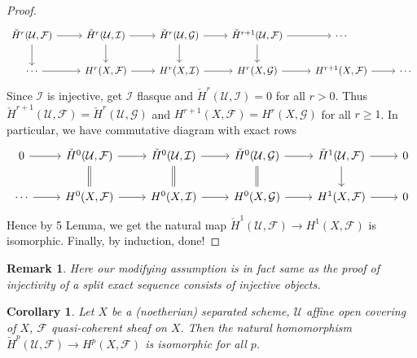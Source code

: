 \documentclass{ctexart}
\newtheorem{remark}{Remark}[section]
\newtheorem{corollary}{Corollary}[section]
\begin{document}
\begin{proof}
\begin{equation*}
\begin{tikzcd}
            \check{H}^{r}(\mathcal{U}, \mathcal{F}) \arrow[r] \arrow[d] &
            \check{H}^{r}(\mathcal{U}, \mathcal{I}) \arrow[r] \arrow[d] &
            \check{H}^{r}(\mathcal{U}, \mathcal{G}) \arrow[r] \arrow[d] &
            \check{H}^{r + 1}(\mathcal{U}, \mathcal{F}) \arrow[r] \arrow[d] &
            \cdots \\
            \cdots \arrow[r] &
            H^{r}(X, \mathcal{F}) \arrow[r] &
            H^{r}(X, \mathcal{I}) \arrow[r] &
            H^{r}(X, \mathcal{G}) \arrow[r] &
            H^{r + 1}(X, \mathcal{F}) \arrow[r] &
            \cdots
        \end{tikzcd}
    \end{equation*}
    Since $\mathcal{I}$ is injective, get $\mathcal{I}$ flasque and $\check{H}^{r}(\mathcal{U}, \mathcal{I}) = 0$ for all $r > 0$.
    Thus $\check{H}^{r + 1}(\mathcal{U}, \mathcal{F}) = \check{H}^{r}(\mathcal{U}, \mathcal{G})$ and $H^{r + 1}(X, \mathcal{F}) = H^{r}(X, \mathcal{G})$ for all $r \ge 1$.
    In particular, we have commutative diagram with exact rows
    \begin{equation*}
        \begin{tikzcd}
            0 \arrow[r] &
            \check{H}^{0}(\mathcal{U}, \mathcal{F}) \arrow[r] \arrow[d, equal] &
            \check{H}^{0}(\mathcal{U}, \mathcal{I}) \arrow[r] \arrow[d, equal] &
            \check{H}^{0}(\mathcal{U}, \mathcal{G}) \arrow[r] \arrow[d, equal] &
            \check{H}^{1}(\mathcal{U}, \mathcal{F}) \arrow[r] \arrow[d] &
            0 \\
            \cdots \arrow[r] &
            H^{0}(X, \mathcal{F}) \arrow[r] &
            H^{0}(X, \mathcal{I}) \arrow[r] &
            H^{0}(X, \mathcal{G}) \arrow[r] &
            H^{1}(X, \mathcal{F}) \arrow[r] &
            0
        \end{tikzcd}
    \end{equation*}
    Hence by 5 Lemma, we get the natural map $\check{H}^{1}(\mathcal{U}, \mathcal{F}) \rightarrow H^{1}(X, \mathcal{F})$ is isomorphic.
    Finally, by induction, done!
\end{proof}
\begin{remark}
    Here our modifying assumption is in fact same as the proof of injectivity of a split exact sequence consists of injective objects.
\end{remark}
\begin{corollary}
    Let $X$ be a (noetherian) separated scheme, $\mathcal{U}$ affine open covering of $X$, $\mathcal{F}$ quasi-coherent sheaf on $X$.
    Then the natural homomorphism $\check{H}^{p}(\mathcal{U}, \mathcal{F}) \longrightarrow H^{p}(X, \mathcal{F})$ is isomorphic for all $p$.
    \label{Corollary 7.6}
\end{corollary}
\end{document}

